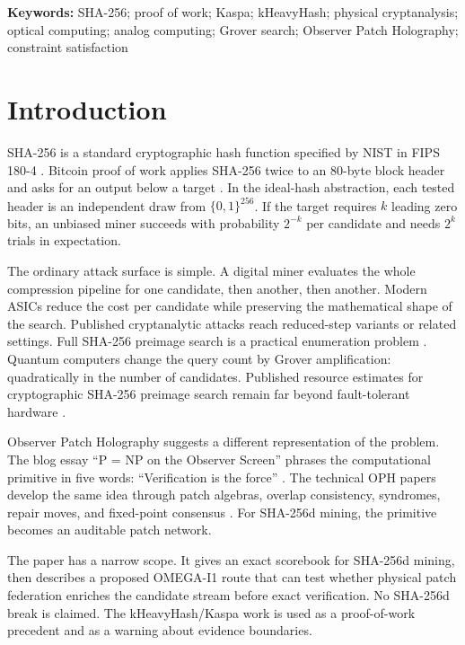 \documentclass[11pt]{article}
\theoremstyle{definition}
\theoremstyle{remark}
\newcommand{\bits}{\{0,1\}}
\begin{document}
\noindent\textbf{Keywords:} SHA-256; proof of work; Kaspa; kHeavyHash;
physical cryptanalysis; optical computing; analog computing; Grover search;
Observer Patch Holography; constraint satisfaction

\section{Introduction}

SHA-256 is a standard cryptographic hash function specified by NIST in FIPS
180-4 \cite{NISTFIPS1804}. Bitcoin proof of work applies SHA-256 twice to an
80-byte block header and asks for an output below a target \cite{Nakamoto2008}.
In the ideal-hash abstraction, each tested header is an independent draw from
\(\bits^{256}\). If the target requires \(k\) leading zero bits, an unbiased
miner succeeds with probability \(2^{-k}\) per candidate and needs \(2^k\)
trials in expectation.

The ordinary attack surface is simple. A digital miner evaluates the whole
compression pipeline for one candidate, then another, then another. Modern
ASICs reduce the cost per candidate while preserving the mathematical shape of
the search. Published cryptanalytic attacks reach reduced-step variants or related
settings. Full SHA-256 preimage search is a practical enumeration problem
\cite{MendelNadSchlaeffer2013,KhovratovichRechbergerSavelieva2011,AlamgirNejatiBright2024}.
Quantum computers change the query count by Grover amplification: quadratically
in the number of candidates. Published resource estimates for
cryptographic SHA-256 preimage search remain far beyond fault-tolerant
hardware \cite{Grover1997,Zalka1999,AmyEtAl2016,NeremGaur2023}.

Observer Patch Holography suggests a different representation of the problem.
The blog essay ``P = NP on the Observer Screen'' phrases the computational
primitive in five words: ``Verification is the force'' \cite{OPHBlogPNP}. The
technical OPH papers develop the same idea through patch algebras, overlap
consistency, syndromes, repair moves, and fixed-point consensus
\cite{OPHObserversCurrent,OPHCompactCurrent,OPHConsensusCurrent,OPHScreenCurrent}. For SHA-256d mining, the
primitive becomes an auditable patch network.

The paper has a narrow scope. It gives an exact scorebook for SHA-256d mining,
then describes a proposed OMEGA-I1 route that can test whether physical patch
federation enriches the candidate stream before exact verification. No SHA-256d
break is claimed. The kHeavyHash/Kaspa work is used as a proof-of-work
precedent and as a warning about evidence boundaries.
\end{document}
